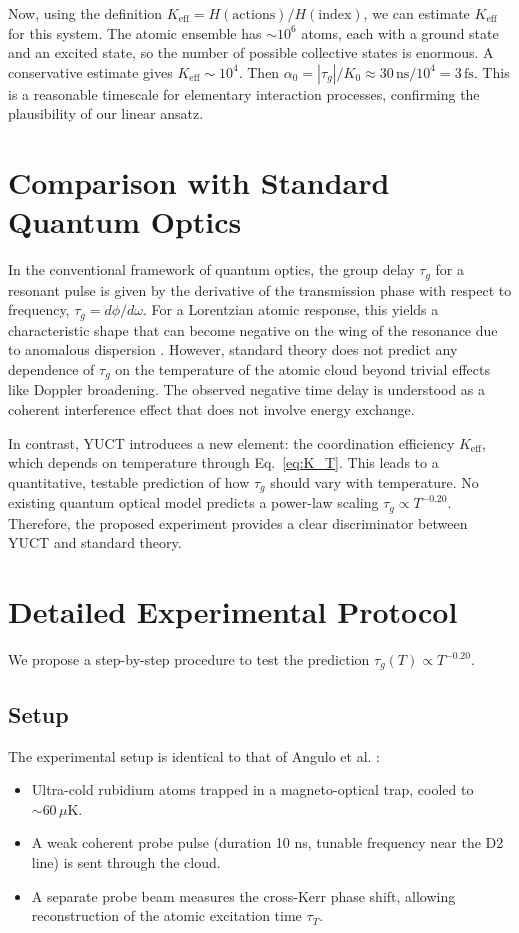 \documentclass[12pt,a4paper]{article}
\newcommand{\Keff}{K_{\mathrm{eff}}}
\begin{document}
	Now, using the definition \(\Keff = H(\text{actions})/H(\text{index})\), we can estimate \(\Keff\) for this system. The atomic ensemble has \(\sim 10^6\) atoms, each with a ground state and an excited state, so the number of possible collective states is enormous. A conservative estimate gives \(\Keff \sim 10^4\). Then \(\alpha_0 = |\tau_g|/K_0 \approx 30\,\mathrm{ns} / 10^4 = 3\,\mathrm{fs}\). This is a reasonable timescale for elementary interaction processes, confirming the plausibility of our linear ansatz.
	
	\section{Comparison with Standard Quantum Optics}
	
	In the conventional framework of quantum optics, the group delay \(\tau_g\) for a resonant pulse is given by the derivative of the transmission phase with respect to frequency, \(\tau_g = d\phi/d\omega\). For a Lorentzian atomic response, this yields a characteristic shape that can become negative on the wing of the resonance due to anomalous dispersion \cite{Milonni2004}. However, standard theory does not predict any dependence of \(\tau_g\) on the temperature of the atomic cloud beyond trivial effects like Doppler broadening. The observed negative time delay is understood as a coherent interference effect that does not involve energy exchange.
	
	In contrast, YUCT introduces a new element: the coordination efficiency \(\Keff\), which depends on temperature through Eq.~\eqref{eq:K_T}. This leads to a quantitative, testable prediction of how \(\tau_g\) should vary with temperature. No existing quantum optical model predicts a power-law scaling \(\tau_g \propto T^{-0.20}\). Therefore, the proposed experiment provides a clear discriminator between YUCT and standard theory.
	
	\section{Detailed Experimental Protocol}
	
	We propose a step-by-step procedure to test the prediction \(\tau_g(T) \propto T^{-0.20}\).
	
	\subsection{Setup}
	The experimental setup is identical to that of Angulo et al. \cite{Angulo2024}:
	\begin{itemize}
		\item Ultra-cold rubidium atoms trapped in a magneto-optical trap, cooled to \(\sim 60\,\mu\mathrm{K}\).
		\item A weak coherent probe pulse (duration 10 ns, tunable frequency near the D2 line) is sent through the cloud.
		\item A separate probe beam measures the cross-Kerr phase shift, allowing reconstruction of the atomic excitation time \(\tau_T\).
	\end{itemize}
	
\end{document}
